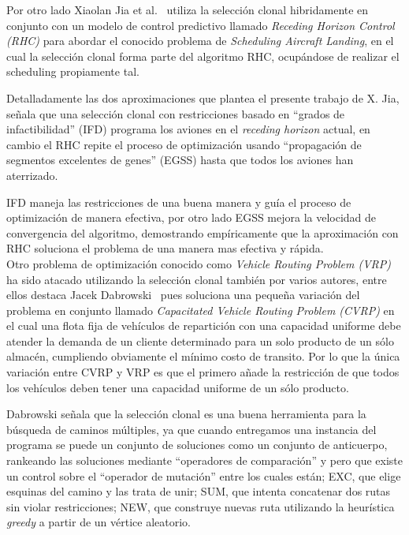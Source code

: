 Por otro lado Xiaolan Jia et al.~\cite{aircraft} utiliza la selección clonal hibridamente en conjunto con un modelo
de control predictivo llamado \emph{Receding Horizon Control (RHC)} para abordar el conocido problema de \emph{Scheduling Aircraft Landing},
en el cual la selección clonal forma parte del algoritmo RHC, ocupándose de realizar el scheduling propiamente tal.

Detalladamente las dos aproximaciones que plantea el presente trabajo de X. Jia, señala que una selección clonal con restricciones
basado en ``grados de infactibilidad'' (IFD) programa los aviones en el \emph{receding horizon} actual, en cambio
el RHC repite el proceso de optimización usando ``propagación de segmentos excelentes de genes'' (EGSS) hasta que todos los aviones
han aterrizado.

IFD maneja las restricciones de una buena manera y guía el proceso de optimización de manera efectiva,
por otro lado EGSS mejora la velocidad de convergencia del algoritmo, demostrando empíricamente que la aproximación con RHC
soluciona el problema de una manera mas efectiva y rápida.\\



Otro problema de optimización conocido como \emph{Vehicle Routing Problem (VRP)} ha sido atacado utilizando la selección clonal
también por varios autores, entre ellos destaca Jacek Dabrowski~\cite{vrp} pues soluciona una pequeña variación del
problema en conjunto llamado \emph{Capacitated Vehicle Routing Problem (CVRP)} en el cual una flota fija de vehículos de repartición
con una capacidad uniforme debe atender la demanda de un cliente determinado para un solo producto de un sólo almacén, cumpliendo
obviamente el mínimo costo de transito. Por lo que la única variación entre CVRP y VRP es que el primero añade la restricción
de que todos los vehículos deben tener una capacidad uniforme de un sólo producto.

Dabrowski señala que la selección clonal es una buena herramienta para la búsqueda de caminos múltiples,
ya que cuando entregamos una instancia del programa se puede un conjunto de soluciones como un conjunto de anticuerpo,
rankeando las soluciones mediante ``operadores de comparación'' y pero que existe un control sobre el ``operador de mutación''
entre los cuales están; EXC, que elige esquinas del camino y las trata de unir; SUM, que intenta concatenar dos rutas sin violar
restricciones; NEW, que construye nuevas ruta utilizando la heurística \emph{greedy} a partir de un vértice aleatorio.

